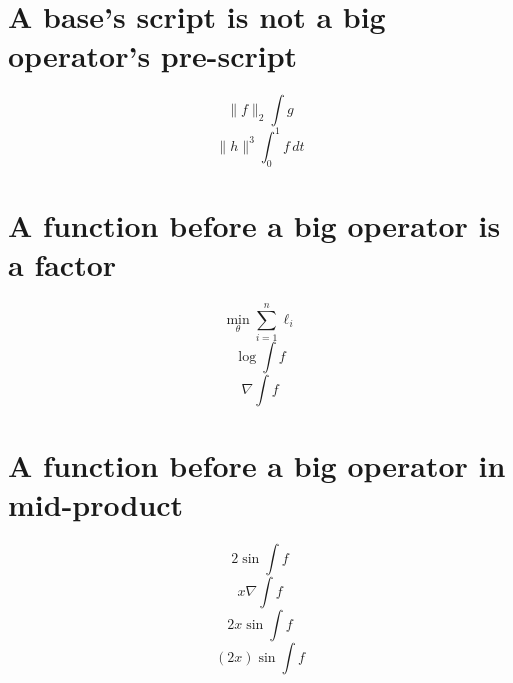 \documentclass{article}
\begin{document}
\section{A base's script is not a big operator's pre-script}
\[ \|f\|_2\int g \]
\[ \|h\|^3\int_0^1 f\,dt \]

\section{A function before a big operator is a factor}
\[ \min_\theta\sum_{i=1}^n\ell_i \]
\[ \log\int f \]
\[ \nabla\int f \]

\section{A function before a big operator in mid-product}
\[ 2\sin\int f \]
\[ x\nabla\int f \]
\[ 2x\sin\int f \]
\[ (2x)\sin\int f \]
\end{document}
